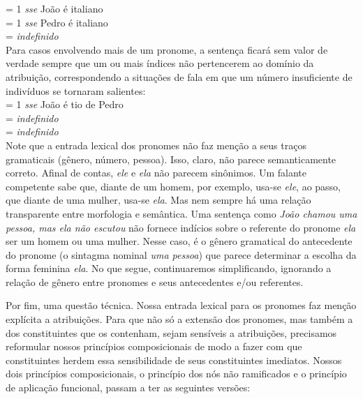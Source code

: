 \n {} = 1 \textit{sse} João é
italiano\\
\n {} = 1 \textit{sse} Pedro
é italiano\\
\n {}\gvaz = \textit{indefinido}\\


Para casos envolvendo mais de um pronome, a sentença ficará sem
valor de verdade sempre que um ou mais índices não pertencerem ao
domínio da atribuição, correspondendo a situações de fala em
que um número insuficiente de indivíduos se tornaram salientes:\\

\n{} = 1 \textit{sse} João é tio de Pedro\\
 = \textit{indefinido}\\
\gvaz = \textit{indefinido}\\


Note que a entrada lexical dos pronomes não faz menção a seus traços gramaticais (gênero, número, pessoa). Isso, claro, não parece semanticamente correto. Afinal de contas, \textit{ele} e \textit{ela} não parecem sinônimos. Um falante competente sabe que, diante de um homem, por exemplo, usa-se \textit{ele}, ao passo, que diante de uma mulher, usa-se \textit{ela}. Mas nem sempre há uma relação transparente entre morfologia e semântica. Uma sentença como \textit{João chamou uma pessoa, mas ela não escutou} não fornece indícios sobre o referente do pronome \textit{ela} ser um homem ou uma mulher. Nesse caso, é o gênero gramatical do antecedente do pronome (o sintagma nominal \textit{uma pessoa}) que parece determinar a escolha da forma feminina \textit{ela}. No que segue, continuaremos simplificando, ignorando a relação de gênero entre pronomes e seus antecedentes e/ou referentes.

Por fim, uma questão técnica. Nossa entrada lexical para os
pronomes faz menção explícita a atribuições. Para que não só a
extensão dos pronomes, mas também a dos constituintes que os
contenham, sejam sensíveis a atribuições, precisamos reformular
nossos princípios composicionais de modo a fazer com que
constituintes herdem essa sensibilidade de seus constituintes
imediatos. Nossos dois princípios composicionais, o princípio dos
nós não ramificados e o princípio de
aplicação funcional, passam a ter as seguintes versões:\\

